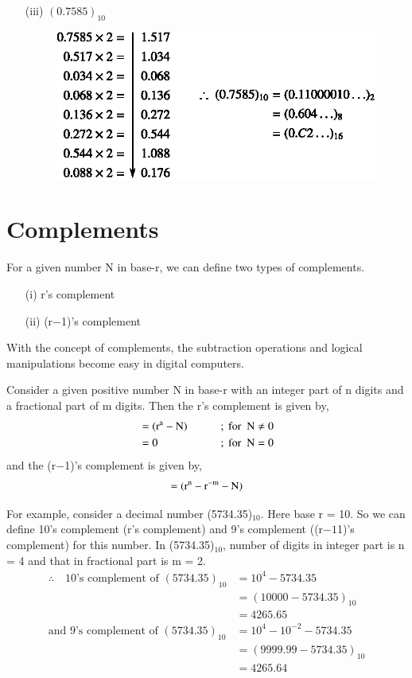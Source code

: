 \begin{solution}
\begin{itemize}
\eject

\item[(iii)] $(0.7585)_{10}$
\begin{figure}[H]
\centering
\includegraphics{chap5/div21.eps}
\end{figure}
\end{itemize}
\end{solution}

\section{Complements}\label{sec5.4}

For a given number N in base-r, we can define two types of complements.
\begin{itemize}
\item[(i)] r's complement

\item[(ii)] (r$-$1)'s complement
\end{itemize}

With the concept of complements, the subtraction operations and logical manipulations become easy in digital computers.

Consider a given positive number N in base-r with an integer part of n digits and a fractional part of m digits. Then the r's complement is given by,
\begin{alignat*}{2}
&= (\textrm{r}^{\textrm{a}}-\textrm{N}) &\qquad& ;\text{ for~ } \textrm{N}\neq 0\\
&= 0                 &\qquad& ; \text{ for~ } \textrm{N} = 0
\end{alignat*}
and the (r$-$1)'s complement is given by,
$$
=(\textrm{r}^{\textrm{n}}-\textrm{r}^{-\textrm{m}}-\textrm{N})
$$

For example, consider a decimal number (5734.35)$_{10}$. Here base r = 10. So we can define 10's complement (r's complement) and 9's complement ((r$-1$1)'s complement) for this number. In (5734.35)$_{10}$, number of digits in integer part is n = 4 and that in fractional part is m = 2.
\begin{align*}
\therefore\quad \text{10's complement of } (5734.35)_{10} &= 10^{4}-5734.35\\[3pt]
 &= (10000-5734.35)_{10}\\[3pt]
 &= 4265.65\\[3pt]
\text{and 9's complement of } (5734.35)_{10} &= 10^{4}-10^{-2}-5734.35\\[3pt]
&= (9999.99-5734.35)_{10}\\[3pt]
&= 4265.64
\end{align*}

